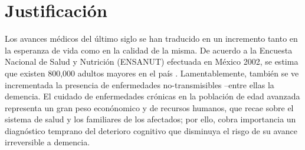 \documentclass[12pt,a4paper]{mitthesis}
\begin{document}

\section{Justificaci\'on}

Los avances m\'edicos del \'ultimo siglo se han traducido en un incremento tanto en la esperanza de 
vida como en la calidad de la misma. 
De acuerdo a la Encuesta Nacional de Salud y Nutrici\'on (ENSANUT) efectuada en M\'exico 2002, se 
estima que existen 800,000 adultos mayores en el pa\'is \cite{Sosa12}. 
Lamentablemente, tambi\'en se ve incrementada la presencia de enfermedades no-transmisibles --entre 
ellas la demencia. 
El cuidado de enfermedades cr\'onicas en la poblaci\'on de edad avanzada representa un gran peso 
econ\'onomico y de recursos humanos, que recae sobre el sistema de salud y los familiares de los 
afectados; por ello, cobra importancia un diagn\'ostico temprano del deterioro cognitivo que 
disminuya el risgo de su avance irreversible a demencia.
\end{document}
